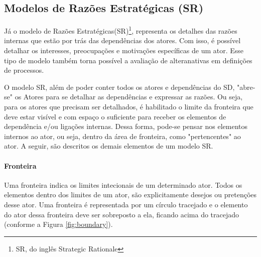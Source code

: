         \subsection{Modelos de Razões Estratégicas (SR)}
                Já o modelo de Razões Estratégicas(SR)\footnote{SR, do inglês Strategic Rationale},
                representa os detalhes das razões internas que estão por trás das dependências dos atores.
                Com isso, é possível detalhar os interesses, preocupações e motivações específicas de um ator.
                Esse tipo de modelo também torna possível a avaliação de alteranativas em definições de processos.

                O modelo SR, além de poder conter todos os atores e dependências do SD, "abre-se" os Atores para se detalhar as dependências e expressar as razões.
                Ou seja, para os atores que precisam ser detalhados, é habilitado o limite da fronteira que deve estar visível e com espaço o suficiente para receber os elementos de dependência e/ou ligações internas. 
                Dessa forma, pode-se pensar nos elementos internos ao ator, ou seja, dentro da área de fronteira, como "pertencentes" ao ator.
                A seguir, são descritos os demais elementos de um modelo SR.

            \paragraph{Fronteira}
                Uma fronteira indica os limites intecionais de um determinado ator. Todos os elementos dentro dos limites de um ator, são explicitamente desejos ou pretenções desse ator. Uma fronteira é representada por um círculo tracejado e o elemento do ator dessa fronteira deve ser sobreposto a ela, ficando acima do tracejado (conforme a Figura \ref{fig:boundary}).

